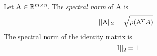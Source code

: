 \begin{example}
    Let $\mathrm{A} \in \mathbb{R}^{m \times n}$. The \textit{spectral norm} of $\mathrm{A}$ is
    $$ ||\mathrm{A}||_2 = \sqrt{\rho{(\mathrm{A}^TA)}} $$
    The spectral norm of the identity matrix is
    $$ ||\mathrm{I}||_2 = 1 $$
\end{example}